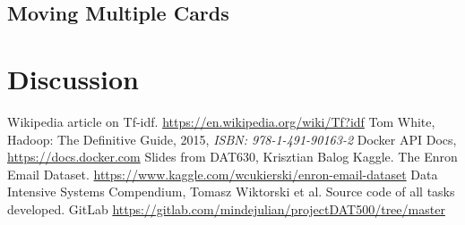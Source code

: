 \documentclass[runningheads,a4paper]{llncs}
\begin{document}
\subsection{Moving Multiple Cards}

\section{Discussion}



\begin{thebibliography}{7}

 Wikipedia article on Tf-idf. \url{https://en.wikipedia.org/wiki/Tf?idf}
 Tom White, Hadoop: The Definitive Guide, 2015, \emph{ISBN: 978-1-491-90163-2}
 Docker API Docs, \url{https://docs.docker.com}
 Slides from DAT630, Krisztian Balog
 Kaggle. The Enron Email Dataset. \url{https://www.kaggle.com/wcukierski/enron-email-dataset}
 Data Intensive Systems Compendium, Tomasz Wiktorski et al.
 Source code of all tasks developed. GitLab \url{https://gitlab.com/mindejulian/projectDAT500/tree/master}

\end{thebibliography}
\end{document}
